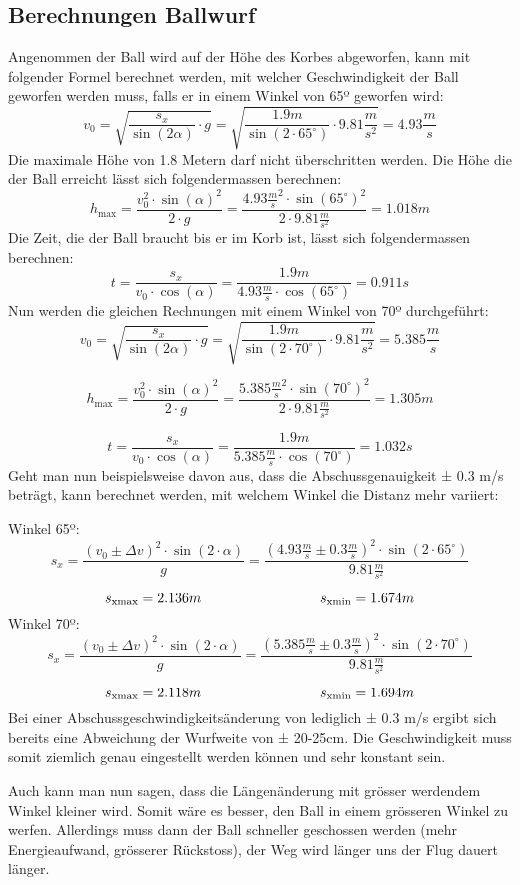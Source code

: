 \subsection{Berechnungen Ballwurf}
Angenommen der Ball wird auf der Höhe des Korbes abgeworfen, kann mit 
folgender Formel berechnet werden, mit welcher Geschwindigkeit der Ball 
geworfen werden muss, falls er in einem Winkel von 65º geworfen wird:
%
\[ v_0 
= \sqrt{ \frac{s_x}{\sin(2\alpha)} \cdot g } 
= \sqrt{ \frac{1.9m}{\sin(2 \cdot 65^\circ)} \cdot 9.81 \frac{m}{s^2}} 
= 4.93 \frac{m}{s} \]
%
Die maximale Höhe von 1.8 Metern darf nicht überschritten werden. Die Höhe die 
der Ball erreicht lässt sich folgendermassen berechnen:
%
\[ h_\text{max} 
= \frac{v_0^2 \cdot \sin(\alpha)^2}{2 \cdot g} 
= \frac{4.93 \frac{m}{s}^2 \cdot \sin(65^\circ)^2}{2 \cdot 9.81 \frac{m}{s^2}} 
= 1.018m \]
%
Die Zeit, die der Ball braucht bis er im Korb ist, lässt sich folgendermassen 
berechnen:
%
\[ t = \frac{s_x}{v_0 \cdot \cos(\alpha)} 
= \frac{1.9m}{4.93 \frac{m}{s} \cdot \cos(65^\circ)} = 0.911s \]
%
Nun werden die gleichen Rechnungen mit einem Winkel von 70º durchgeführt:
%
\[ v_0 = \sqrt{ \frac{s_x}{\sin(2\alpha)} \cdot g } 
= \sqrt{ \frac{1.9m}{\sin(2 \cdot 70^\circ)} \cdot 9.81 \frac{m}{s^2}} 
= 5.385 \frac{m}{s} \]

\[ h_\text{max} = \frac{v_0^2 \cdot \sin(\alpha)^2}{2 \cdot g} 
= \frac{5.385 \frac{m}{s}^2 \cdot \sin(70^\circ)^2}{2 \cdot 9.81 \frac{m}{s^2}} 
= 1.305m \]

\[ t = \frac{s_x}{v_0 \cdot \cos(\alpha)} 
= \frac{1.9m}{5.385 \frac{m}{s} \cdot \cos(70^\circ)} = 1.032s \]
%
Geht man nun beispielsweise davon aus, dass die Abschussgenauigkeit ± 0.3 m/s 
beträgt, kann berechnet werden, mit welchem Winkel die Distanz mehr variiert:

\noindent
Winkel 65º:
%
\[ s_x = \frac{(v_0 \pm \Delta v)^2 \cdot \sin(2 \cdot \alpha)}{g} 
= \frac{(4.93 \frac{m}{s} \pm 0.3 \frac{m}{s})^2 \cdot \sin(2 \cdot 65^\circ)}{9.81 \frac{m}{s^2}} \]

\[ s_\text{xmax} = 2.136m \hspace{30mm} s_\text{xmin} = 1.674m \]
%
Winkel 70º:
%
\[ s_x = \frac{(v_0 \pm \Delta v)^2 \cdot \sin(2 \cdot \alpha)}{g} 
= \frac{(5.385 \frac{m}{s} \pm 0.3 \frac{m}{s})^2 \cdot \sin(2 \cdot 70^\circ)}{9.81 \frac{m}{s^2}} \]

\[ s_\text{xmax} = 2.118m \hspace{30mm} s_\text{xmin} = 1.694m \]
%
Bei einer Abschussgeschwindigkeitsänderung von lediglich ± 0.3 m/s ergibt sich 
bereits eine Abweichung der Wurfweite von ± 20-25cm. Die Geschwindigkeit muss 
somit ziemlich genau eingestellt werden können und sehr konstant sein.

\noindent
Auch kann man nun sagen, dass die Längenänderung mit grösser werdendem Winkel 
kleiner wird. Somit wäre es besser, den Ball in einem grösseren Winkel zu 
werfen. Allerdings muss dann der Ball schneller geschossen werden (mehr 
Energieaufwand, grösserer Rückstoss), der Weg wird länger uns der Flug dauert 
länger.
